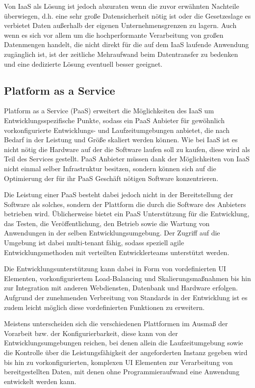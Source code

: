 Von IaaS als Lösung ist jedoch abzuraten wenn die zuvor erwähnten Nachteile überwiegen, d.h. eine sehr große Datensicherheit nötig ist oder die Gesetzeslage es verbietet Daten außerhalb der eigenen Unternehmensgrenzen zu lagern. Auch wenn es sich vor allem um die hochperformante Verarbeitung von großen Datenmengen handelt, die nicht direkt für die auf dem IaaS laufende Anwendung zugänglich ist, ist der zeitliche Mehraufwand beim Datentransfer zu bedenken und eine dedizierte Lösung eventuell besser geeignet. 

\subsection{Platform as a Service}
Platform as a Service (PaaS) erweitert die Möglichkeiten des IaaS um Entwicklungsspezifische Punkte, sodass ein PaaS Anbieter für gewöhnlich vorkonfigurierte Entwicklungs- und Laufzeitumgebungen anbietet, die nach Bedarf in der Leistung und Größe skaliert werden können. Wie bei IaaS ist es nicht nötig die Hardware auf der die Software laufen soll zu kaufen, diese wird als Teil des Services gestellt. PaaS Anbieter müssen dank der Möglichkeiten von IaaS nicht einmal selber Infrastruktur besitzen, sondern können sich auf die Optimierung der für ihr PaaS Geschäft nötigen Software konzentrieren. 

Die Leistung einer PaaS besteht dabei jedoch nicht in der Bereitstellung der Software als solches, sondern der Plattform die durch die Software des Anbieters betrieben wird. Üblicherweise bietet ein PaaS Unterstützung für die Entwicklung, das Testen, die Veröffentlichung, den Betrieb sowie die Wartung von Anwendungen in der selben Entwicklungsumgebung. Der Zugriff auf die Umgebung ist dabei multi-tenant fähig, sodass speziell agile Entwicklungsmethoden mit verteilten Entwicklerteams unterstützt werden. 

Die Entwicklungsunterstützung kann dabei in Form von vordefinierten UI Elementen, vorkonfiguriertem Load-Balancing und Skalierungsmaßnahmen bis hin zur Integration mit anderen Webdiensten, Datenbank und Hardware erfolgen. Aufgrund der zunehmenden Verbreitung von Standards in der Entwicklung ist es zudem leicht möglich diese vordefinierten Funktionen zu erweitern. 

Meistens unterscheiden sich die verschiedenen Plattformen im Ausmaß der Vorarbeit bzw. der Konfigurierbarkeit, diese kann von der Entwicklungsumgebungen reichen, bei denen allein die Laufzeitumgebung sowie die Kontrolle über die Leistungsfähigkeit der angeforderten Instanz gegeben wird bis hin zu vorkonfigurierten, komplexen UI Elementen zur Verarbeitung von bereitgestellten Daten, mit denen ohne Programmieraufwand eine Anwendung entwickelt werden kann.

